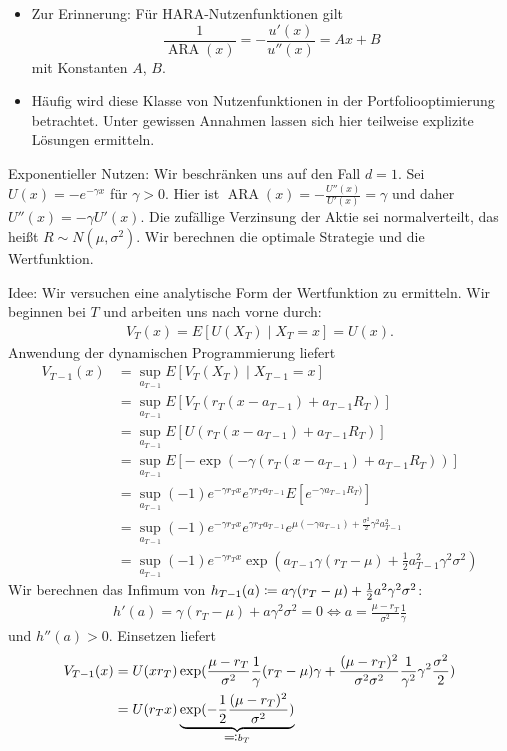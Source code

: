 \documentclass[a4paper,twoside,DIV15,BCOR12mm]{scrbook}
\DeclareMathOperator{\ARA}{ARA}
\begin{document}
\begin{bemerkung}
\begin{itemize}
\item Zur Erinnerung: Für HARA-Nutzenfunktionen gilt
\[
\frac{1}{\ARA(x)} = -\frac{u'(x)}{u''(x)} = Ax+B
\]
mit Konstanten $A$, $B$.
\item Häufig wird diese Klasse von Nutzenfunktionen in der Portfoliooptimierung betrachtet. Unter gewissen Annahmen lassen sich hier teilweise explizite Lösungen ermitteln.
\end{itemize}
\end{bemerkung}

\begin{beispiel}
Exponentieller Nutzen: Wir beschränken uns auf den Fall $d=1$. Sei $U(x) = - e^{-\gamma x}$ für $\gamma>0$. Hier ist $\ARA(x) = -\frac{U''(x)}{U'(x)} = \gamma$ und daher $U''(x) = -\gamma U'(x)$. Die zufällige Verzinsung der Aktie sei normalverteilt, das heißt $R\sim N(\mu, \sigma^2)$. Wir berechnen die optimale Strategie und die Wertfunktion.

Idee: Wir versuchen eine analytische Form der Wertfunktion zu ermitteln. Wir beginnen bei $T$ und arbeiten uns nach vorne durch:
\begin{align*}
V_T(x) = E[U(X_T)\mid X_T=x] = U(x).
\end{align*}
Anwendung der dynamischen Programmierung liefert
\begin{align*}
V_{T-1}(x) &= \sup_{a_{T-1}} E[V_T(X_T) \mid X_{T-1}=x]\\
&= \sup_{a_{T-1}} E[V_T(r_T (x-a_{T-1}) + a_{T-1}R_T)] \\
&= \sup_{a_{T-1}} E[U(r_T(x-a_{T-1}) + a_{T-1} R_T)] \\
&= \sup_{a_{T-1}} E[-\exp(-\gamma (r_T(x-a_{T-1}) + a_{T-1} R_T))] \\
&= \sup_{a_{T-1}} (-1) e^{-\gamma r_Tx} e^{\gamma r_T a_{T-1}} E[e^{-\gamma a_{T-1} R_T)}] \\
&= \sup_{a_{T-1}} (-1) e^{-\gamma r_Tx} e^{\gamma r_T a_{T-1}} e^{\mu(-\gamma a_{T-1}) + \frac{\sigma^2}{2} \gamma^2 a_{T-1}^2} \\
&= \sup_{a_{T-1}} (-1) e^{-\gamma r_Tx} \exp(a_{T-1} \gamma(r_T -\mu) + \frac12 a_{T-1}^2 \gamma^2  \sigma^2)
\end{align*}
Wir berechnen das Infimum von $h_{T-1}(a) \da a\gamma (r_T-\mu) + \frac12 a^2\gamma^2 \sigma^2$:
\begin{align*}
h'(a) = \gamma(r_T-\mu) + a\gamma^2 \sigma^2 = 0 \iff a= \frac{\mu-r_T}{\sigma^2} \frac 1 \gamma
\end{align*}
und $h''(a) >0$. Einsetzen liefert
\begin{align*}
V_{T-1}(x) &= U(xr_T) \exp (\frac{\mu-r_T}{\sigma^2} \frac1\gamma (r_T - \mu) \gamma + \frac{(\mu-r_T)^2}{\sigma^2\sigma^2} \frac1{\gamma^2} \gamma^2 \frac{\sigma^2}{2}) \\
&= U(r_Tx) \underbrace{\exp(-\frac12 \frac{(\mu- r_T)^2}{\sigma^2})}_{\ad b_T}
\end{align*}


\end{beispiel}
\end{document}
